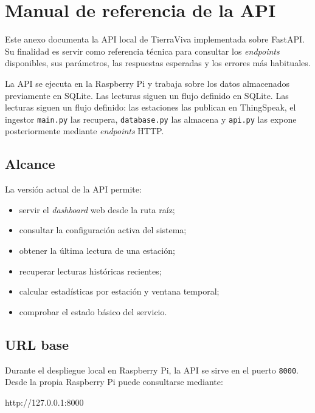 \chapter{Manual de referencia de la API}
\label{anexo:manual_api}

Este anexo documenta la API local de TierraViva implementada sobre FastAPI. Su finalidad es servir como referencia técnica para consultar los \textit{endpoints} disponibles, sus parámetros, las respuestas esperadas y los errores más habituales.

La API se ejecuta en la Raspberry Pi y trabaja sobre los datos almacenados previamente en SQLite. Las lecturas siguen un flujo definido en SQLite. Las lecturas siguen un flujo definido: las estaciones las publican en ThingSpeak, el ingestor \texttt{main.py} las recupera, \texttt{database.py} las almacena y \texttt{api.py} las expone posteriormente mediante \textit{endpoints} HTTP.

\section{Alcance}

La versión actual de la API permite:

\begin{itemize}
    \item servir el \textit{dashboard} web desde la ruta raíz;
    \item consultar la configuración activa del sistema;
    \item obtener la última lectura de una estación;
    \item recuperar lecturas históricas recientes;
    \item calcular estadísticas por estación y ventana temporal;
    \item comprobar el estado básico del servicio.
\end{itemize}

\section{URL base}

Durante el despliegue local en Raspberry Pi, la API se sirve en el puerto \texttt{8000}. Desde la propia Raspberry Pi puede consultarse mediante:

\begin{terminaloutput}
http://127.0.0.1:8000
\end{terminaloutput}

